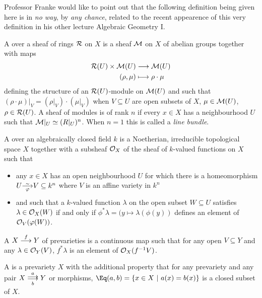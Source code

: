 \documentclass[a4paper,parskip=half,numbers=enddot, DIV=12]{scrreprt}
\begin{document}
Professor Franke would like to point out that the following definition being given here is in \emph{no way}, by \emph{any chance}, related to the recent appearence of this very definition in his other lecture Algebraic Geometry I.

\begin{defi}
    A  over a sheaf of rings $\mathcal{R}$ on $X$ is a sheaf $\mathcal{M}$ on $X$ of abelian groups together with maps 
    \begin{align*}
        \Rr(U) \times \Mm(U) &\morphism \Mm(U)\\
        (\rho,\mu) &\longmapsto \rho\cdot\mu
    \end{align*}
    defining the structure of an $\mathcal{R}(U)$-module on $\mathcal{M}(U)$ and such that $(\rho\cdot \mu)|_V = (\rho|_V)\cdot (\mu|_V)$ when $V\subseteq U$ are open subsets of $X$, $\mu\in \mathcal{M}(U)$, $\rho \in \mathcal{R}(U)$. A sheaf of modules is  of rank $n$ if every $x\in X$ has a neighbourhood $U$ such that $\mathcal{M}|_U\simeq(R|_U)^n$. When $n=1$ this is called a \emph{line bundle}.
\end{defi}
\begin{defi}[Prevariety]
    A  over an algebraically closed field $k$ is a Noetherian, irreducible topological space $X$ together with a subsheaf $\mathcal{O}_X$ of the sheaf of $k$-valued functions on $X$ such that 
    \begin{itemize}
    	\item any $x\in X$ has an open neighbourhood $U$ for which there is a homeomorphism $U\smash{\isomorphism[\phi]} V\subseteq k^n$ where $V$ is an affine variety in $k^n$
    	\item and such that a $k$-valued function $\lambda$ on the open subset $W\subseteq U$ satisfies $\lambda \in \mathcal{O}_X(W)$ if and only if $\phi^*\lambda = (y\mapsto \lambda(\phi(y))$ defines an element of $\mathcal{O}_V(\varphi(W))$. 
    \end{itemize}
    
    A  $X\morphism[f] Y$ of prevarieties is a continuous map such that for any open $V\subseteq Y$ and any $\lambda \in\mathcal{O}_Y(V)$, $f^*\lambda$ is an element of $\mathcal{O}_X(f^{-1}V)$.
    
    A  is a prevariety $X$ with the additional property that for any prevariety and any pair $X\doublemorphism[a][b] Y$ or morphisms, $\Eq(a,b) = \left\{x\in X\st a(x) = b(x)\right\}$ is a closed subset of $X$.
\end{defi}
\end{document}
